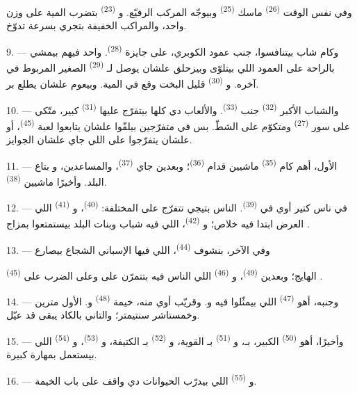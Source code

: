 وفي نفس الوقت  \textsuperscript{(26)} ماسك 
\textsuperscript{(25)} وبيوجّه المركب الرفيّع. و \textsuperscript{(23)}
بتضرب المية على وزن واحد، والمراكب الخفيفة بتجري بسرعة تدوّخ.

9. --- وكام شاب بيتنافسوا، جنب عمود الكوبري، على جايزة 
\textsuperscript{(28)}. واحد فيهم بيمشي بالراحة على العمود اللي بيتلوّى وبيزحلق
علشان يوصل لـ \textsuperscript{(29)} الصغير المربوط في آخره.
و \textsuperscript{(30)} قليل البخت وقع في المية. وبيعوم علشان يطلع بر.

10. --- والشباب الأكبر  \textsuperscript{(32)} جنب
 \textsuperscript{(33)}. والألعاب دي كلها بيتفرّج عليها 
\textsuperscript{(31)} كبير، متّكي على سور  \textsuperscript{(27)}
ومتكوّم على الشطّ. بس في متفرّجين بيلفّوا علشان يتابعوا لعبة  \textsuperscript{(45)}، أو علشان يتفرّجوا على  اللي جاي
علشان  الجوايز.

11. --- الأول، أهم كام  \textsuperscript{(35)} ماشيين قدام
 \textsuperscript{(36)}؛ وبعدين جاي  \textsuperscript{(37)}،
والمساعدين، و بتاع البلد. وأخيرًا ماشيين
 \textsuperscript{(38)}.

\VUsaut{5.0mm}
\VUsaut{3.6mm}

12. --- في ناس كتير أوي في  \textsuperscript{(39)}. الناس بتيجي
تتفرّج على  المختلفة:  \textsuperscript{(40)}،
و \textsuperscript{(41)} اللي العرض ابتدا فيه خلاص؛ و \textsuperscript{(42)}، اللي فيه شباب وبنات البلد بيستمتعوا بمزاج
.

13. --- وفي الآخر، بنشوف  \textsuperscript{(44)}، اللي فيها
 الإسباني الشجاع بيصارع

 \textsuperscript{(45)} الهايج؛ وبعدين 
\textsuperscript{(49)}، و \textsuperscript{(46)} اللي الناس فيه
بتتمرّن على  وعلى الضرب على .

14. --- وجنبه، أهو  \textsuperscript{(47)} اللي بيمثّلوا فيه
 و. وقريّب أوي منه، خيمة 
\textsuperscript{(48)} و.  الأول مترين وخمستاشر سنتيمتر؛
والتاني بالكاد يبقى قد عيّل.

15. --- وأخيرًا، أهو  \textsuperscript{(50)} الكبير، بـ، و \textsuperscript{(51)} بـ القوية،
و \textsuperscript{(52)} بـ الكتيفة، و
\textsuperscript{(53)}، و \textsuperscript{(54)} اللي بيستعمل
 بمهارة كبيرة.

16. --- و \textsuperscript{(55)} اللي بيدرّب الحيوانات دي واقف على
باب الخيمة.

\VUsaut{6.0mm}
\VUfilet{22mm}
